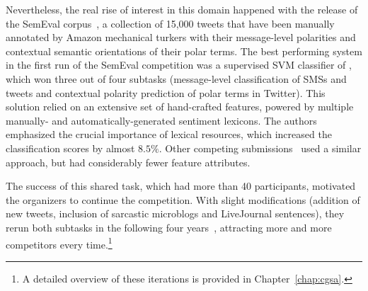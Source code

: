 Nevertheless, the real rise of interest in this domain happened with
the release of the Sem\-Eval corpus~\cite{Nakov:13}, a collection of
15,000 tweets that have been manually annotated by Amazon mechanical
turkers with their message-level polarities and contextual semantic
orientations of their polar terms. The best performing system in the
first run of the SemEval competition was a supervised SVM classifier
of \citet{Mohammad:13}, which won three out of four subtasks
(message-level classification of SMSs and tweets and contextual
polarity prediction of polar terms in Twitter).  This solution relied
on an extensive set of hand-crafted features, powered by multiple
manually- and automatically-generated sentiment lexicons.  The authors
emphasized the crucial importance of lexical resources, which
increased the classification scores by almost $8.5\%$.  Other
competing submissions~\cite{Becker:13,Guenther:13,Kokciyan:13} used a
similar approach, but had considerably fewer feature attributes.

The success of this shared task, which had more than 40 participants,
motivated the organizers to continue the competition.  With slight
modifications (addition of new tweets, inclusion of sarcastic
microblogs and LiveJournal sentences), they rerun both subtasks in the
following four
years~\cite{Rosenthal:14,Rosenthal:15,Nakov:16,Rosenthal:17},
attracting more and more competitors every time.\footnote{A detailed
  overview of these iterations is provided in
  Chapter~\ref{chap:cgsa}.}



